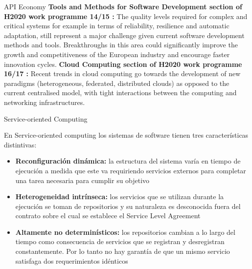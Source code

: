 \documentclass[10pt,xcolor={table,dvipsnames},t]{beamer}
\begin{document}
\begin{frame}{API Economy}
 \textbf{Tools and Methods for Software Development section of H2020 work
 programme 14/15
 :} 
 The quality levels required for complex and critical systems for example in terms of reliability, resilience and automatic adaptation, still represent a major challenge given current software development methods and tools. Breakthroughs in this area could significantly improve the growth and competitiveness of the European industry and encourage faster innovation cycles.
\textbf{Cloud Computing section of H2020 work programme 16/17 
:} Recent trends in cloud computing go towards the development of new paradigms (heterogeneous, federated, distributed clouds) as opposed to the current centralised model, with tight interactions between the computing and networking infrastructures.
\end{frame}

\begin{frame}{Service-oriented Computing}

En Service-oriented computing los sistemas de software tienen tres características distintivas:
\begin{itemize}
  \item \textbf{Reconfiguración dinámica:} la estructura del sistema varía en tiempo de ejecución a medida que este va requiriendo servicios externos para completar una tarea necesaria para cumplir su objetivo

  \item \textbf{Heterogeneidad intrínseca:} los servicios que se utilizan durante la ejecución se toman de repositorios y su naturaleza es desconocida fuera del contrato sobre el cual se establece el Service Level Agreement
  
  \item \textbf{Altamente no determinísticos:} los repositorios cambian a lo largo del tiempo como consecuencia de servicios que se registran y desregistran constantemente. Por lo tanto no hay garantía de que un mismo servicio satisfaga dos requerimientos idénticos 

\end{itemize}

\end{frame}
\end{document}
